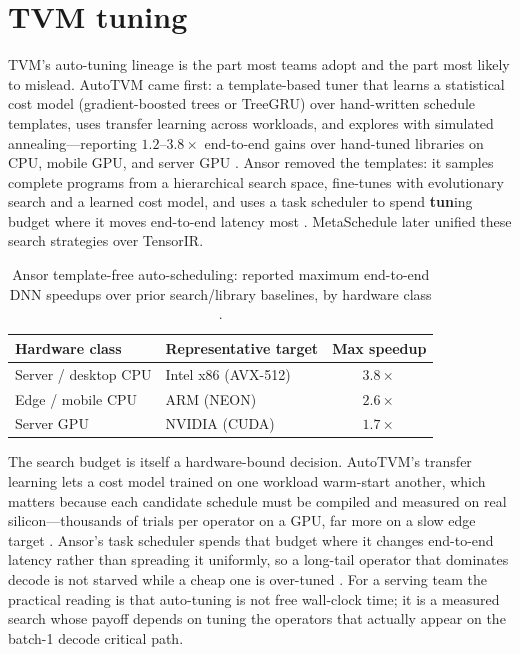 \section{TVM tuning}
\label{sec:ch16_tvm_tuning}

TVM's auto-tuning lineage is the part most teams adopt and the part most likely to mislead. AutoTVM came first: a template-based tuner that learns a statistical cost model (gradient-boosted trees or TreeGRU) over hand-written schedule templates, uses transfer learning across workloads, and explores with simulated annealing---reporting $1.2$--$3.8\times$ end-to-end gains over hand-tuned libraries on CPU, mobile GPU, and server GPU \citep{chen2018autotvm}. Ansor removed the templates: it samples complete programs from a hierarchical search space, fine-tunes with evolutionary search and a learned cost model, and uses a task scheduler to spend \textbf{tun}ing budget where it moves end-to-end latency most \citep{zheng2020ansor}. MetaSchedule later unified these search strategies over TensorIR.

\begin{table}[t]
\centering
\caption{Ansor template-free auto-scheduling: reported maximum end-to-end DNN speedups over prior search/library baselines, by hardware class \citep{zheng2020ansor}.}
\label{tab:ch16_ansor_speedup}
\begin{tabular}{llc}
\toprule
Hardware class & Representative target & Max speedup \\
\midrule
Server / desktop CPU & Intel x86 (AVX-512) & $3.8\times$ \\
Edge / mobile CPU & ARM (NEON) & $2.6\times$ \\
Server GPU & NVIDIA (CUDA) & $1.7\times$ \\
\bottomrule
\end{tabular}
\end{table}

The search budget is itself a hardware-bound decision. AutoTVM's transfer learning lets a cost model trained on one workload warm-start another, which matters because each candidate schedule must be compiled and measured on real silicon---thousands of trials per operator on a GPU, far more on a slow edge target \citep{chen2018autotvm}. Ansor's task scheduler spends that budget where it changes end-to-end latency rather than spreading it uniformly, so a long-tail operator that dominates decode is not starved while a cheap one is over-tuned \citep{zheng2020ansor}. For a serving team the practical reading is that auto-tuning is not free wall-clock time; it is a measured search whose payoff depends on tuning the operators that actually appear on the batch-1 decode critical path.

